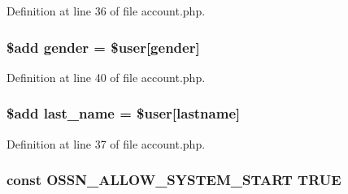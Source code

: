 Definition at line 36 of file account.\+php.

\subsubsection[{\texorpdfstring{gender}{gender}}]{\setlength{\rightskip}{0pt plus 5cm}\${\bf add} gender = \${\bf user}\mbox{[}\textquotesingle{}gender\textquotesingle{}\mbox{]}}\hypertarget{actions_2account_8php_a44147631c08dfda5f5bf50dc774f7090}{}\label{actions_2account_8php_a44147631c08dfda5f5bf50dc774f7090}


Definition at line 40 of file account.\+php.

\subsubsection[{\texorpdfstring{last\+\_\+name}{last_name}}]{\setlength{\rightskip}{0pt plus 5cm}\${\bf add} last\+\_\+name = \${\bf user}\mbox{[}\textquotesingle{}lastname\textquotesingle{}\mbox{]}}\hypertarget{actions_2account_8php_ad28df3187bc8c49657d3800bb449f939}{}\label{actions_2account_8php_ad28df3187bc8c49657d3800bb449f939}


Definition at line 37 of file account.\+php.

\subsubsection[{\texorpdfstring{O\+S\+S\+N\+\_\+\+A\+L\+L\+O\+W\+\_\+\+S\+Y\+S\+T\+E\+M\+\_\+\+S\+T\+A\+RT}{OSSN_ALLOW_SYSTEM_START}}]{\setlength{\rightskip}{0pt plus 5cm}const O\+S\+S\+N\+\_\+\+A\+L\+L\+O\+W\+\_\+\+S\+Y\+S\+T\+E\+M\+\_\+\+S\+T\+A\+RT T\+R\+UE}\hypertarget{actions_2account_8php_a73aeae1243c8451cb328ddfe84637175}{}\label{actions_2account_8php_a73aeae1243c8451cb328ddfe84637175}


